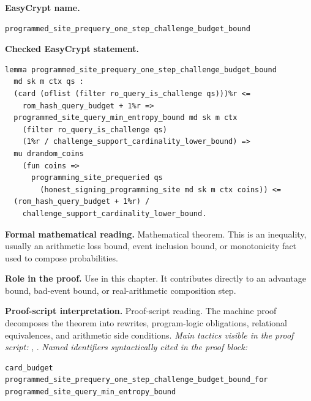\begin{formaltheorem}
\noindent\textbf{EasyCrypt name.}
\begin{lstlisting}[language=EasyCrypt,basicstyle=\ttfamily\scriptsize]
programmed_site_prequery_one_step_challenge_budget_bound
\end{lstlisting}
\noindent\textbf{Checked EasyCrypt statement.}
\begin{lstlisting}[language=EasyCrypt,basicstyle=\ttfamily\scriptsize]
lemma programmed_site_prequery_one_step_challenge_budget_bound
  md sk m ctx qs :
  (card (oflist (filter ro_query_is_challenge qs)))%r <=
    rom_hash_query_budget + 1%r =>
  programmed_site_query_min_entropy_bound md sk m ctx
    (filter ro_query_is_challenge qs)
    (1%r / challenge_support_cardinality_lower_bound) =>
  mu drandom_coins
    (fun coins =>
      programming_site_prequeried qs
        (honest_signing_programming_site md sk m ctx coins)) <=
  (rom_hash_query_budget + 1%r) /
    challenge_support_cardinality_lower_bound.
\end{lstlisting}
\noindent\textbf{Formal mathematical reading.}
Mathematical theorem. This is an inequality, usually an arithmetic loss bound, event inclusion bound, or monotonicity fact used to compose probabilities.

\noindent\textbf{Role in the proof.}
Use in this chapter. It contributes directly to an advantage bound, bad-event bound, or real-arithmetic composition step.

\noindent\textbf{Proof-script interpretation.}
Proof-script reading. The machine proof decomposes the theorem into rewrites, program-logic obligations, relational equivalences, and arithmetic side conditions.
\emph{Main tactics visible in the proof script:} , .
\emph{Named identifiers syntactically cited in the proof block:}
\begin{lstlisting}[language=EasyCrypt,basicstyle=\ttfamily\scriptsize]
card_budget
programmed_site_prequery_one_step_challenge_budget_bound_for
programmed_site_query_min_entropy_bound
\end{lstlisting}

\end{formaltheorem}

